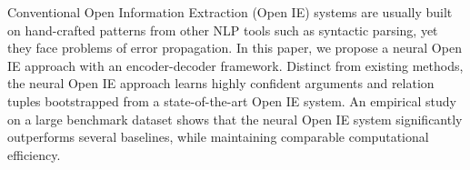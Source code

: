 Conventional Open Information Extraction (Open IE) systems are usually built on hand-crafted patterns from other NLP tools such as syntactic parsing, yet they face problems of error propagation. In this paper, we propose a neural Open IE approach with an encoder-decoder framework. Distinct from existing methods, the neural Open IE approach learns highly confident arguments and relation tuples bootstrapped from a state-of-the-art Open IE system. An empirical study on a large benchmark dataset shows that the neural Open IE system significantly outperforms several baselines, while maintaining comparable computational efficiency.
